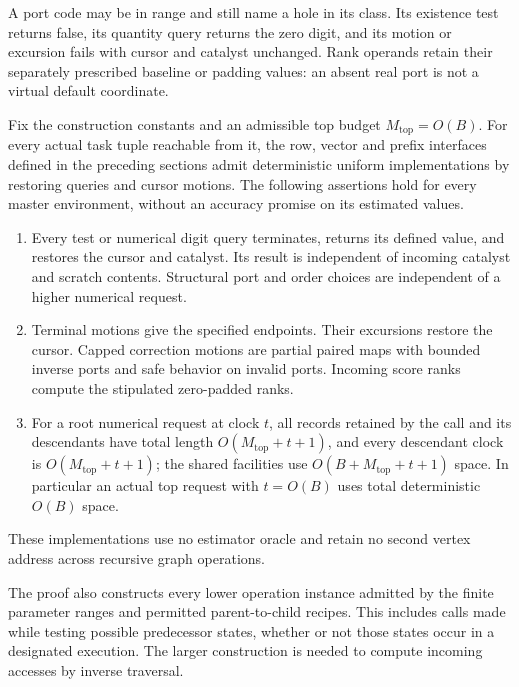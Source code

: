 A port code may be in range and still name a hole in its class.  Its
existence test returns false, its quantity query returns the zero digit,
and its motion or excursion fails with cursor and catalyst unchanged.
Rank operands retain their separately prescribed baseline or padding
values: an absent real port is not a virtual default coordinate.

\begin{theorem}\label{thm:ctrl-realization}
Fix the construction constants and an admissible top budget
$M_{\mathrm{top}}=O(B)$.  For every actual task tuple reachable from it,
the row, vector and prefix interfaces defined in the preceding sections
admit deterministic uniform implementations by restoring queries and
cursor motions.
The following assertions hold for every master environment, without an
accuracy promise on its estimated values.
\begin{enumerate}
\item Every test or numerical digit query terminates, returns its
  defined value, and restores the cursor and catalyst.  Its result is
  independent of incoming catalyst and scratch contents.  Structural
  port and order choices are independent of a higher numerical request.
\item Terminal motions give the specified endpoints.  Their excursions
  restore the cursor.  Capped correction motions are partial paired
  maps with bounded inverse ports and safe behavior on invalid ports.
  Incoming score ranks compute the stipulated zero-padded ranks.
\item For a root numerical request at clock $t$, all records retained by the
  call and its descendants have total length $O(M_{\mathrm{top}}+t+1)$,
  and every descendant clock is $O(M_{\mathrm{top}}+t+1)$; the shared
  facilities use $O(B+M_{\mathrm{top}}+t+1)$ space.  In particular an
  actual top request with $t=O(B)$ uses total deterministic $O(B)$ space.
\end{enumerate}
These implementations use no estimator oracle and retain no second
vertex address across recursive graph operations.
\end{theorem}

The proof also constructs every lower operation instance admitted by the
finite parameter ranges and permitted parent-to-child recipes.  This
includes calls made while testing possible predecessor states, whether
or not those states occur in a designated execution.  The larger
construction is needed to compute incoming accesses by inverse traversal.

